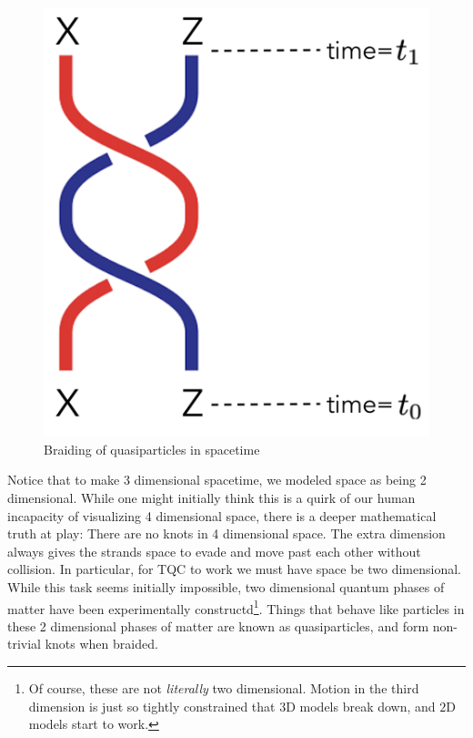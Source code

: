\documentclass{article}
\theoremstyle{definition}
\numberwithin{figure}{section}
\begin{document}
\begin{figure}
\begin{center}
\includegraphics[scale=0.25]{braiding}
\caption{Braiding of quasiparticles in spacetime}
\label{fig:braiding}
\end{center}
\end{figure}

Notice that to make 3 dimensional spacetime, we modeled space as being 2 dimensional. While one might initially think this is a quirk of our human incapacity of visualizing 4 dimensional space, there is a deeper mathematical truth at play: There are no knots in 4 dimensional space. The extra dimension always gives the strands space to evade and move past each other without collision. In particular, for TQC to work we must have space be two dimensional. While this task seems initially impossible, two dimensional quantum phases of matter have been experimentally constructd\footnote{Of course, these are not \textit{literally} two dimensional. Motion in the third dimension is just so tightly constrained that $3$D models break down, and $2$D models start to work.}. Things that behave like particles in these 2 dimensional phases of matter are known as quasiparticles, and form non-trivial knots when braided.
\end{document}
